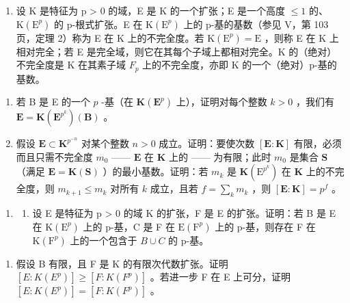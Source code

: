 \BourbakiExerciseGroup

\begin{enumerate}
\def\labelenumi{\arabic{enumi})}
\tightlist
\item
  设 K 是特征为 p \textgreater{} 0 的域，E 是 K 的一个扩张；E 是一个高度 \(\leqslant 1\) 的、\(\mathrm{K}(\mathrm{E}^{p})\) 的 p-根式扩张。E 在 \(\mathrm{K}(\mathrm{E}^{p})\) 上的 p-基的基数（参见 V，第 103 页，定理 2）称为 E 在 K 上的不完全度。若 \(\mathrm{K}(\mathrm{E}^{p}) = \mathrm{E}\) ，则称 E 在 K 上相对完全；若 E 是完全域，则它在其每个子域上都相对完全。K 的（绝对）不完全度是 K 在其素子域 \(F_{p}\) 上的不完全度，亦即 K 的一个（绝对）p-基的基数。
\end{enumerate}

\begin{enumerate}
\def\labelenumi{\alph{enumi})}
\item
  若 B 是 E 的一个 \(p\) -基（在 \(\mathbf{K}(\mathbf{E}^p)\) 上），证明对每个整数 \(k > 0\) ，我们有 \(\mathbf{E} = \mathbf{K}(\mathbf{E}^{p^k})(\mathbf{B})\) 。
\item
  假设 \(\mathbf{E} \subset \mathbf{K}^{p^{-n}}\) 对某个整数 \(n > 0\) 成立。证明：要使次数 \([\mathbf{E}:\mathbf{K}]\) 有限，必须而且只需不完全度 \(m_0\) —— \(\mathbf{E}\) 在 \(\mathbf{K}\) 上的 —— 为有限；此时 \(m_0\) 是集合 \(\mathbf{S}\) （满足 \(\mathbf{E} = \mathbf{K}(\mathbf{S})\) ）的最小基数。证明：若 \(m_k\) 是 \(\mathbf{K}(\mathrm{E}^{p^k})\) 在 \(\mathbf{K}\) 上的不完全度，则 \(m_{k + 1} \leqslant m_k\) 对所有 \(k\) 成立，且若 \(f = \sum_{k} m_k\) ，则 \([\mathbf{E}:\mathbf{K}] = p^f\) 。
\end{enumerate}

\begin{enumerate}
\def\labelenumi{\arabic{enumi})}
\setcounter{enumi}{1}
\tightlist
\item
  \begin{enumerate}
  \def\labelenumii{\alph{enumii})}
  \tightlist
  \item
    设 E 是特征为 p \textgreater{} 0 的域 K 的扩张，F 是 E 的扩张。证明：若 B 是 E 在 \(\mathrm{K}(\mathrm{E}^{p})\) 上的 p-基，C 是 F 在 \(\mathrm{E}(\mathrm{F}^{p})\) 上的 p-基，则存在 F 在 \(\mathrm{K}(\mathrm{F}^{p})\) 上的一个包含于 \(B \cup C\) 的 p-基。
  \end{enumerate}
\end{enumerate}

\begin{enumerate}
\def\labelenumi{\alph{enumi})}
\setcounter{enumi}{1}
\tightlist
\item
  假设 B 有限，且 F 是 K 的有限次代数扩张。证明 \([E:K(E^{p})]\geqslant[F:K(F^{p})]\) 。若进一步 F 在 E 上可分，证明 \([E:K(E^{p})]=[F:K(F^{p})]\) 。
\end{enumerate}

